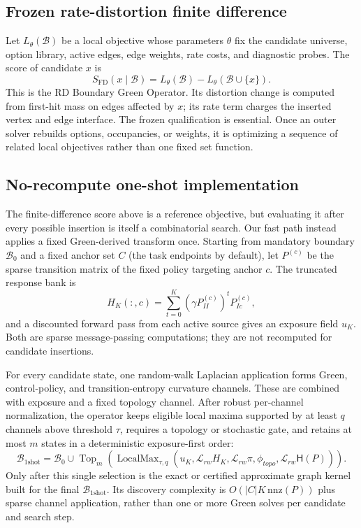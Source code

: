 \documentclass[10pt]{article}
\newcommand{\B}{\mathcal{B}}
\begin{document}
\subsection{Frozen rate-distortion finite difference}
Let $L_\theta(\B)$ be a local objective whose parameters $\theta$ fix the
candidate universe, option library, active edges, edge weights, rate costs, and
diagnostic probes. The score of candidate $x$ is
\begin{equation}
S_{\mathrm{FD}}(x\mid\B)=L_\theta(\B)-L_\theta(\B\cup\{x\}).
\end{equation}
This is the RD Boundary Green Operator. Its distortion change is computed from
first-hit mass on edges affected by $x$; its rate term charges the inserted
vertex and edge interface. The frozen qualification is essential. Once an
outer solver rebuilds options, occupancies, or weights, it is optimizing a
sequence of related local objectives rather than one fixed set function.

\subsection{No-recompute one-shot implementation}
The finite-difference score above is a reference objective, but evaluating it
after every possible insertion is itself a combinatorial search. Our fast path
instead applies a fixed Green-derived transform once. Starting from mandatory
boundary $\B_0$ and a fixed anchor set $C$ (the task endpoints by default), let
$P^{(c)}$ be the sparse transition matrix of the fixed policy targeting anchor
$c$. The truncated response bank is
\begin{equation}
H_K(:,c)=\sum_{t=0}^{K}(\gamma P^{(c)}_{II})^tP^{(c)}_{Ic},
\end{equation}
and a discounted forward pass from each active source gives an exposure field
$u_K$. Both are sparse message-passing computations; they are not recomputed
for candidate insertions.

For every candidate state, one random-walk Laplacian application forms Green,
control-policy, and transition-entropy curvature channels. These are combined
with exposure and a fixed topology channel. After robust per-channel
normalization, the operator keeps eligible local maxima supported by at least
$q$ channels above threshold $\tau$, requires a topology or stochastic gate,
and retains at most $m$ states in a deterministic exposure-first order:
\begin{equation}
\B_{\mathrm{1shot}}=\B_0\cup
\operatorname{Top}_m\!\left(\operatorname{LocalMax}_{\tau,q}
(u_K,\mathcal L_{rw}H_K,\mathcal L_{rw}\pi,
\phi_{topo},\mathcal L_{rw}\mathsf H(P))\right).
\end{equation}
Only after this single selection is the exact or certified approximate graph
kernel built for the final $\B_{\mathrm{1shot}}$. Its discovery complexity is
$O(|C|K\,\mathrm{nnz}(P))$ plus sparse channel application, rather than one or
more Green solves per candidate and search step.
\end{document}
